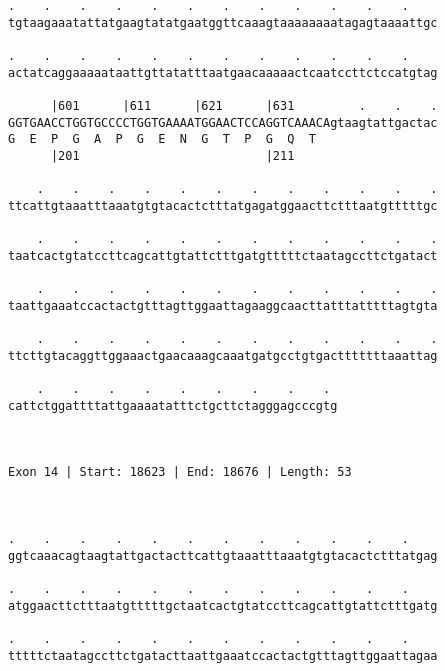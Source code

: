 \documentclass{article}
\begin{document}
\begin{Verbatim}
.    .    .    .    .    .    .    .    .    .    .    .    
tgtaagaaatattatgaagtatatgaatggttcaaagtaaaaaaaatagagtaaaattgc
                                                            
.    .    .    .    .    .    .    .    .    .    .    .    
actatcaggaaaaataattgttatatttaatgaacaaaaactcaatccttctccatgtag
                                                            
      |601      |611      |621      |631         .    .    .
GGTGAACCTGGTGCCCCTGGTGAAAATGGAACTCCAGGTCAAACAgtaagtattgactac
G  E  P  G  A  P  G  E  N  G  T  P  G  Q  T                 
      |201                          |211                    
  
    .    .    .    .    .    .    .    .    .    .    .    .
ttcattgtaaatttaaatgtgtacactctttatgagatggaacttctttaatgtttttgc
                                                            
    .    .    .    .    .    .    .    .    .    .    .    .
taatcactgtatccttcagcattgtattctttgatgtttttctaatagccttctgatact
                                                            
    .    .    .    .    .    .    .    .    .    .    .    .
taattgaaatccactactgtttagttggaattagaaggcaacttatttatttttagtgta
                                                            
    .    .    .    .    .    .    .    .    .    .    .    .
ttcttgtacaggttggaaactgaacaaagcaaatgatgcctgtgactttttttaaattag
                                                            
    .    .    .    .    .    .    .    .    . 
cattctggattttattgaaaatatttctgcttctagggagcccgtg
                                              
                                              
 
Exon 14 | Start: 18623 | End: 18676 | Length: 53



.    .    .    .    .    .    .    .    .    .    .    .    
ggtcaaacagtaagtattgactacttcattgtaaatttaaatgtgtacactctttatgag
                                                            
.    .    .    .    .    .    .    .    .    .    .    .    
atggaacttctttaatgtttttgctaatcactgtatccttcagcattgtattctttgatg
                                                            
.    .    .    .    .    .    .    .    .    .    .    .    
tttttctaatagccttctgatacttaattgaaatccactactgtttagttggaattagaa
                                                            

\end{Verbatim}
\end{document}
